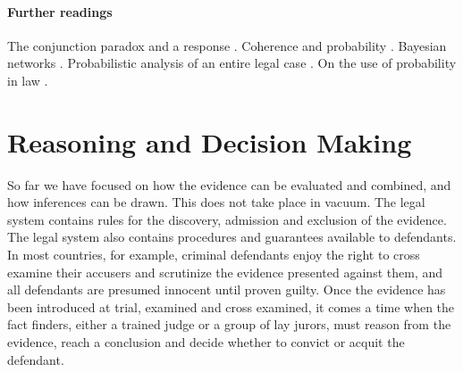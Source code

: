 \documentclass[10pt]{article}
\begin{document}
\paragraph{Further readings}
The conjunction paradox \citep{cohen1977} and a response \citep{dawid1987}. 
Coherence and probability \citep{bovensHartman2003}.
Bayesian networks \citep{taroniEtal2006}. Probabilistic 
analysis of an entire legal case \citep{kadaneSchum1996}.
On the use of probability in law \citep{fenton2011}.






\section{Reasoning and Decision Making}
\label{sec:whenconv}
\label{sec:intexc}


So far we have focused on how the evidence can be evaluated and combined, and how inferences can be drawn. 
This does not take place in vacuum. 
The legal system contains rules for the discovery, admission and exclusion of the evidence. 
The legal system also contains 
procedures and guarantees available to defendants. In most countries, for example, criminal defendants enjoy 
the right to cross examine their accusers and scrutinize the evidence presented against them, and all defendants are 
presumed innocent until proven guilty. 
Once the evidence has been introduced at trial, examined and cross examined, it comes a time when the fact finders, either a 
trained judge or a group of lay jurors, must reason from the evidence, reach a conclusion and decide 
whether to convict or acquit the defendant. 
\end{document}
